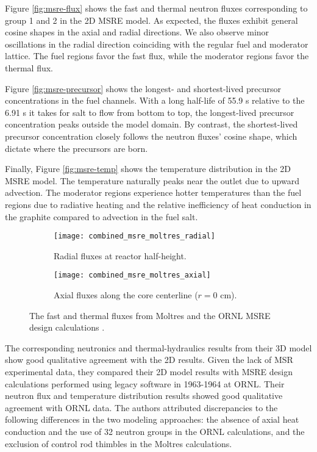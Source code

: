 Figure \ref{fig:msre-flux} shows the fast and thermal neutron fluxes
corresponding to group 1 and 2 in the 2D \gls{MSRE} model. As expected, the
fluxes exhibit general cosine shapes in the axial and radial directions. We
also observe minor oscillations in the radial direction coinciding with the
regular fuel and moderator lattice. The fuel regions favor the fast flux, while
the moderator regions favor the thermal flux.

Figure \ref{fig:msre-precursor}
shows the longest- and shortest-lived precursor concentrations in the fuel
channels. With a long half-life of 55.9 s relative to the 6.91 s it takes for
salt to flow from bottom to top, the longest-lived precursor concentration peaks
outside the model domain. By contrast, the shortest-lived precursor
concentration closely follows the neutron fluxes' cosine shape, which
dictate where the precursors are born.

Finally, Figure \ref{fig:msre-temp}
shows the temperature distribution in the 2D \gls{MSRE} model. The temperature
naturally peaks near the outlet due to upward advection. The moderator regions
experience hotter temperatures than the fuel regions due to radiative heating
and the relative inefficiency of heat conduction in the graphite compared to
advection in the fuel salt.

\begin{figure}[htb!]
	\centering
	\begin{subfigure}[h]{0.45\columnwidth}
	    \texttt{[image: combined\_msre\_moltres\_radial]}
	    \caption{Radial fluxes at reactor half-height.}
	    \label{fig:msre-flux-radial}
	\end{subfigure}
	\hfill
	\begin{subfigure}[h]{0.45\columnwidth}
	    \texttt{[image: combined\_msre\_moltres\_axial]}
	    \caption{Axial fluxes along the core centerline ($r=0$ cm).}
	    \label{fig:msre-flux-axial}
	\end{subfigure}
	\caption{The fast and thermal fluxes from
	Moltres \cite{lindsay_introduction_2018} and the \gls{ORNL} \gls{MSRE}
	design calculations \cite{briggs_molten-salt_1964}.}
\end{figure}

The corresponding neutronics and thermal-hydraulics results from their 3D model
show good qualitative agreement with the 2D results. Given the lack of
\gls{MSR} experimental data, they compared their 2D model results with
\gls{MSRE} design calculations performed using legacy software in 1963-1964 at
\gls{ORNL}. Their neutron flux and temperature distribution results showed good
qualitative agreement with \gls{ORNL} data. The authors attributed
discrepancies to the following differences in the two modeling approaches: the
absence of axial heat conduction and the use of 32 neutron groups in the
\gls{ORNL} calculations, and the exclusion of control rod thimbles in the
Moltres calculations.

